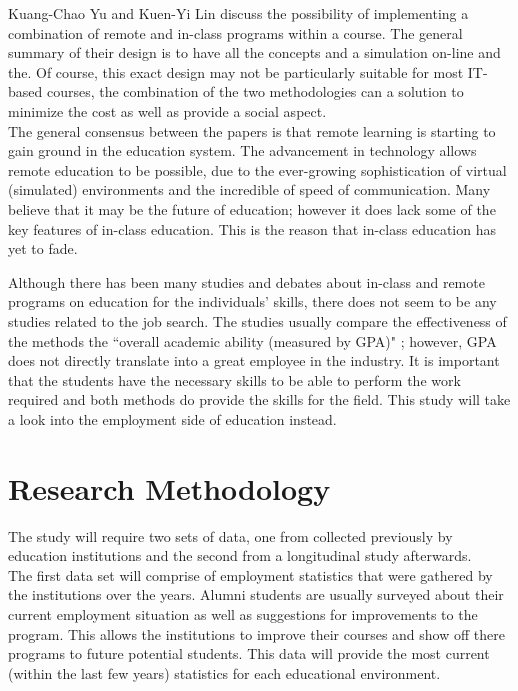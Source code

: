 \documentclass[titlepage]{article}
\begin{document}
\noindent Kuang-Chao Yu and Kuen-Yi Lin \cite{6} discuss the possibility of implementing a
combination of remote and in-class programs within a course.  The general summary of their design
is to have all the concepts and a simulation on-line and the.  Of course, this exact design may not be particularly
suitable for most IT-based courses, the combination of the two methodologies can a solution to
minimize the cost as well as provide a social aspect.\\

\noindent The general consensus between the papers is that remote learning is starting to gain ground
in the education system.  The advancement in technology allows remote education to be possible,
due to the ever-growing sophistication of virtual (simulated) environments and the incredible
of speed of communication.  Many believe that it may be the future of education; however it does
lack some of the key features of in-class education.  This is the reason that in-class education
has yet to fade.\\

\clearpage

\noindent Although there has been many studies and debates about in-class and remote programs on
education for the individuals' skills, there does not seem to be any studies related to the job
search.  The studies usually compare the effectiveness of the methods the ``overall academic ability
(measured by GPA)" \cite{3}; however, GPA does not directly translate into a great employee in
the industry. It is important that the students have the necessary skills to be able to perform
the work required and both methods do provide the skills for the field.  This study will take a
look into the employment side of education instead.

\clearpage

\section{Research Methodology}
The study will require two sets of data, one from collected previously by education institutions
and the second from a longitudinal study afterwards. \\

\noindent The first data set will comprise of employment statistics that were gathered by the institutions
over the years.  Alumni students are usually surveyed about their current employment situation as well as
suggestions for improvements to the program.  This allows the institutions to improve their
courses and show off there programs to future potential students.  This data will provide the most current
(within the last few years) statistics for each educational environment.\\
\end{document}
